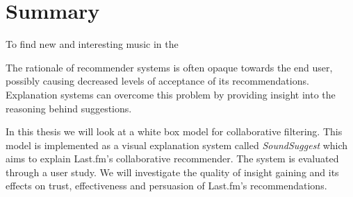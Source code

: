 \chapter*{Summary}\label{chapter:summary:english}


To find new and interesting music in the 

The rationale of recommender systems is often opaque towards the end user, possibly causing decreased levels of acceptance of its recommendations. Explanation systems can overcome this problem by providing insight into the reasoning behind suggestions\cite{herlocker:2000}.

In this thesis we will look at a white box model for collaborative filtering. This model is implemented as a visual explanation system called \emph{SoundSuggest} which aims to explain Last.fm's collaborative recommender. The system is evaluated through a user study. We will investigate the quality of insight gaining and its effects on trust, effectiveness and persuasion of Last.fm's recommendations.